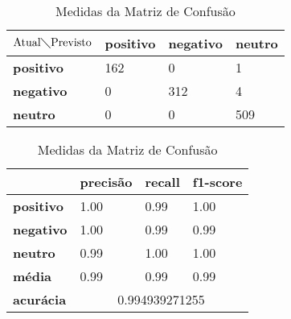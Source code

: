 \begin{table}[h!]
\centering
\begin{minipage}[b]{0.45\linewidth}
\caption{Matriz de Confusão Ternário: \textit{Random Forest}}
\label{tab:mcb-nb}
\begin{tabular}{|l|l|l|l|}
\hline
$\textrm{Atual}\diagdown\textrm{Previsto}$ & \textbf{positivo} & \textbf{negativo} & \textbf{neutro}\\ \hline
\textbf{positivo} & 162 & 0 & 1\\ \hline
\textbf{negativo} & 0 & 312 & 4\\ \hline
\textbf{neutro} & 0 & 0 & 509\\ \hline
\end{tabular}
\end{minipage}
\hspace{0.5cm}
\begin{minipage}[b]{0.45\linewidth}

\centering
\caption{Medidas da Matriz de Confusão}
\label{tab:mmcb-nb}
\begin{tabular}{|l|l|l|l|}
\hline
         & \textbf{precisão} & \textbf{recall} & \textbf{f1-score} \\ \hline
\textbf{positivo} & 1.00     & 0.99   & 1.00     \\ \hline
\textbf{negativo} & 1.00     & 0.99   & 0.99     \\ \hline
\textbf{neutro} & 0.99     & 1.00   & 1.00     \\ \hline
\textbf{média} & 0.99     & 0.99   & 0.99     \\ \hline
\textbf{acurácia} & \multicolumn{3}{|c|}{0.994939271255}\\ \hline
\end{tabular}
\end{minipage}
\end{table}


